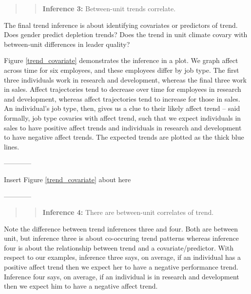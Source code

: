 \documentclass[english,,man]{apa6}
\theoremstyle{definition}
\theoremstyle{definition}
\theoremstyle{definition}
\theoremstyle{remark}
\begin{document}
\begin{quote}
\begin{quote}
\textbf{Inference 3:} Between-unit trends correlate.
\end{quote}
\end{quote}

The final trend inference is about identifying covariates or predictors
of trend. Does gender predict depletion trends? Does the trend in unit
climate covary with between-unit differences in leader quality?

Figure \ref{trend_covariate} demonstrates the inference in a plot. We
graph affect across time for six employees, and these employees differ
by job type. The first three individuals work in research and
development, whereas the final three work in sales. Affect trajectories
tend to decrease over time for employees in research and development,
whereas affect trajectories tend to increase for those in sales. An
individual's job type, then, gives us a clue to their likely affect
trend -- said formally, job type covaries with affect trend, such that
we expect individuals in sales to have positive affect trends and
individuals in research and development to have negative affect trends.
The expected trends are plotted as the thick blue lines.

\begin{center}

------------

Insert Figure \ref{trend_covariate} about here

------------

\end{center}

\begin{quote}
\begin{quote}
\textbf{Inference 4:} There are between-unit correlates of trend.
\end{quote}
\end{quote}

Note the difference between trend inferences three and four. Both are
between unit, but inference three is about co-occuring trend patterns
whereas inference four is about the relationship between trend and a
covariate/predictor. With respect to our examples, inference three says,
on average, if an individual has a positive affect trend then we expect
her to have a negative performance trend. Inference four says, on
average, if an individual is in research and development then we expect
him to have a negative affect trend.
\end{document}
